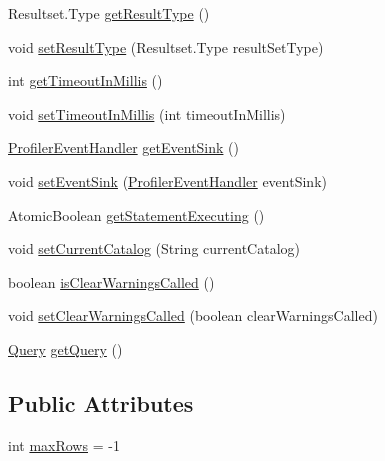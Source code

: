 \begin{DoxyCompactItemize}
\item 
Resultset.\+Type \mbox{\hyperlink{classcom_1_1mysql_1_1cj_1_1jdbc_1_1_statement_impl_a4f0bfa0851a118ae62acd9420304bdd0}{get\+Result\+Type}} ()
\item 
void \mbox{\hyperlink{classcom_1_1mysql_1_1cj_1_1jdbc_1_1_statement_impl_a7b30ea29a192772e8c464cec82eacb32}{set\+Result\+Type}} (Resultset.\+Type result\+Set\+Type)
\item 
int \mbox{\hyperlink{classcom_1_1mysql_1_1cj_1_1jdbc_1_1_statement_impl_ae819d62406476bbeb71be402eff8f619}{get\+Timeout\+In\+Millis}} ()
\item 
void \mbox{\hyperlink{classcom_1_1mysql_1_1cj_1_1jdbc_1_1_statement_impl_a88a77da140cb220313f9f876f08ee0a1}{set\+Timeout\+In\+Millis}} (int timeout\+In\+Millis)
\item 
\mbox{\hyperlink{interfacecom_1_1mysql_1_1cj_1_1log_1_1_profiler_event_handler}{Profiler\+Event\+Handler}} \mbox{\hyperlink{classcom_1_1mysql_1_1cj_1_1jdbc_1_1_statement_impl_a718d61ccf9261f402e7d28a295aca55c}{get\+Event\+Sink}} ()
\item 
void \mbox{\hyperlink{classcom_1_1mysql_1_1cj_1_1jdbc_1_1_statement_impl_a7f46764af12c9648ac8ac2929b275fd4}{set\+Event\+Sink}} (\mbox{\hyperlink{interfacecom_1_1mysql_1_1cj_1_1log_1_1_profiler_event_handler}{Profiler\+Event\+Handler}} event\+Sink)
\item 
Atomic\+Boolean \mbox{\hyperlink{classcom_1_1mysql_1_1cj_1_1jdbc_1_1_statement_impl_ab253ad63963434ee5cde7ca8e68f7ff6}{get\+Statement\+Executing}} ()
\item 
void \mbox{\hyperlink{classcom_1_1mysql_1_1cj_1_1jdbc_1_1_statement_impl_a30dda4ad8c6bc0be8eb3c926c9a1e0f1}{set\+Current\+Catalog}} (String current\+Catalog)
\item 
boolean \mbox{\hyperlink{classcom_1_1mysql_1_1cj_1_1jdbc_1_1_statement_impl_a63d97344f6b1ebede1e07b71d13a923d}{is\+Clear\+Warnings\+Called}} ()
\item 
void \mbox{\hyperlink{classcom_1_1mysql_1_1cj_1_1jdbc_1_1_statement_impl_a6e7f50419ea0c769393113fde7de7b87}{set\+Clear\+Warnings\+Called}} (boolean clear\+Warnings\+Called)
\item 
\mbox{\hyperlink{interfacecom_1_1mysql_1_1cj_1_1_query}{Query}} \mbox{\hyperlink{classcom_1_1mysql_1_1cj_1_1jdbc_1_1_statement_impl_a03be1a8bab079e9da100366153fc4238}{get\+Query}} ()
\end{DoxyCompactItemize}
\subsection*{Public Attributes}
\begin{DoxyCompactItemize}
\item 
int \mbox{\hyperlink{classcom_1_1mysql_1_1cj_1_1jdbc_1_1_statement_impl_aa64fae9361367a5f37523a7031bb0e69}{max\+Rows}} = -\/1
\end{DoxyCompactItemize}
